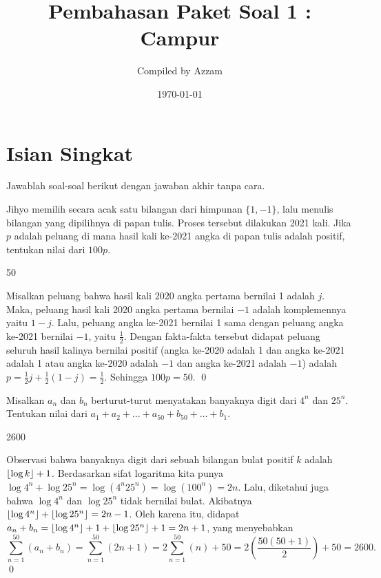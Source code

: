 \documentclass[12pt]{scrartcl}
\begin{document}
	\title{Pembahasan Paket Soal 1 : Campur} %
	\date{\today}
	\author{Compiled by Azzam}
	\maketitle

\renewcommand*\contentsname{Daftar Isi}
\tableofcontents

\newpage
	\newpage
	

	\section{Isian Singkat}
	Jawablah soal-soal berikut dengan jawaban akhir tanpa cara.
	
	\begin{soaljawab}
		Jihyo memilih secara acak satu bilangan dari himpunan $\{1,-1\}$, lalu menulis bilangan yang dipilihnya di papan tulis. Proses tersebut dilakukan 2021 kali. Jika $p$ adalah peluang di mana hasil kali ke-2021 angka di papan tulis adalah positif, tentukan nilai dari $100p$.
		
		\begin{jawaban}
						50
					\end{jawaban}
					\begin{solusi}
					Misalkan peluang bahwa hasil kali 2020 angka pertama bernilai 1 adalah $j$. Maka, peluang hasil kali 2020 angka pertama bernilai $-1$ adalah komplemennya yaitu $1-j$. Lalu, peluang angka ke-2021 bernilai 1 sama dengan peluang angka ke-2021 bernilai $-1$, yaitu $\frac{1}{2}$. Dengan fakta-fakta tersebut didapat peluang seluruh hasil kalinya bernilai positif (angka ke-2020 adalah 1 dan angka ke-2021 adalah 1 atau angka ke-2020 adalah $-1$ dan angka ke-2021 adalah $-1$) adalah $p=\frac{1}{2}j+\frac{1}{2}(1-j) = \frac{1}{2}$. Sehingga $100p = 50$. \qed
					\end{solusi}
	\end{soaljawab}
	
	\begin{soaljawab}
		Misalkan $a_n$ dan $b_n$ berturut-turut menyatakan banyaknya digit dari $4^n$ dan $25^n$. Tentukan nilai dari $a_1+a_2+\dots +a_{50}+b_{50}+\dots+b_1$.
		
		\begin{jawaban}
				2600
				\end{jawaban}
				\begin{solusi}
				Observasi bahwa banyaknya digit dari sebuah bilangan bulat positif $k$ adalah $\left\lfloor \log k \right\rfloor+1$. Berdasarkan sifat logaritma kita punya $\log 4^n + \log 25^n = \log (4^n25^n) = \log (100^n) = 2n$. Lalu, diketahui juga bahwa $\log 4^n$ dan $\log 25^n$ tidak bernilai bulat. Akibatnya $\left\lfloor \log 4^n \right\rfloor+\left\lfloor \log 25^n \right\rfloor = 2n-1$. Oleh karena itu, didapat $a_n+b_n =\left\lfloor \log 4^n \right\rfloor+1+\left\lfloor \log 25^n \right\rfloor+1= 2n+1$, yang menyebabkan $$\sum_{n=1}^{50}(a_n+b_n)=\sum_{n=1}^{50}(2n+1)=2\sum_{n=1}^{50}(n)+50=2\left(\frac{50(50+1)}{2}\right)+50=2600.$$ \qed
				\end{solusi}
	\end{soaljawab}
\end{document}
